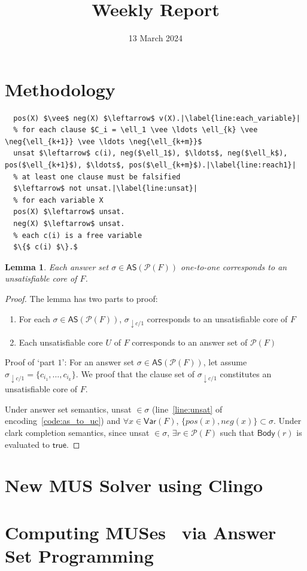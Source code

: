 \documentclass{article}
\title{Weekly Report}
\newtheorem{lemma}{Lemma}
\newtheorem{proof}{Proof}
\newcommand{\program}[1]{\mathcal{P}(#1)}
\newcommand{\body}[1]{\mathsf{Body}(#1)}
\newcommand{\true}{\ensuremath{\mathsf{true}}\xspace}
\newcommand{\Var}[1]{\mathsf{Var}(#1)}
\newcommand{\answer}[1]{\mathsf{AS}(#1)}
\begin{document}
\date{13 March 2024}
\section{Methodology}
\begin{lstlisting}[caption={Program $\program{F}$},label={code:as_to_uc},captionpos=b,mathescape=true,escapechar=|,float]
  % for each variable X
  pos(X) $\vee$ neg(X) $\leftarrow$ v(X).|\label{line:each_variable}|
  % for each clause $C_i = \ell_1 \vee \ldots \ell_{k} \vee \neg{\ell_{k+1}} \vee \ldots \neg{\ell_{k+m}}$
  unsat $\leftarrow$ c(i), neg($\ell_1$), $\ldots$, neg($\ell_k$), pos($\ell_{k+1}$), $\ldots$, pos($\ell_{k+m}$).|\label{line:reach1}|
  % at least one clause must be falsified
  $\leftarrow$ not unsat.|\label{line:unsat}|
  % for each variable X
  pos(X) $\leftarrow$ unsat.
  neg(X) $\leftarrow$ unsat.
  % each c(i) is a free variable
  $\{$ c(i) $\}.$
\end{lstlisting}
\begin{lemma}
  Each answer set $\sigma \in \answer{\program{F}}$ one-to-one corresponds to an unsatisfiable core of $F$.
\end{lemma}
\begin{proof}
  The lemma has two parts to proof:
  \begin{enumerate}
    \item For each $\sigma \in \answer{\program{F}}$, $\sigma_{\downarrow c/1}$ corresponds to an unsatisfiable core of $F$
    \item Each unsatisfiable core $U$ of $F$ corresponds to an answer set of $\program{F}$ 
  \end{enumerate}
  Proof of `part $1$': For an answer set $\sigma \in \answer{\program{F}}$, let assume $\sigma_{\downarrow c/1} = \{c_{i_1}, \ldots, c_{i_k}\}$.
  We proof that the clause set of $\sigma_{\downarrow c/1}$ constitutes an unsatisfiable core of $F$.

  Under answer set semantics, unsat $\in \sigma$ (line~\ref{line:unsat} of encoding~\ref{code:as_to_uc}) and $\forall x \in \Var{F}$, $\{pos(x), neg(x)\} \subset \sigma$.
  Under clark completion semantics, since unsat $\in \sigma$, $\exists r \in \program{F}$ such that 
  $\body{r}$ is evaluated to $\true$. 
\end{proof}
\section{New MUS Solver using Clingo}
\section{Computing MUSes~\cite{LPMM2016} via Answer Set Programming}
\end{document}
